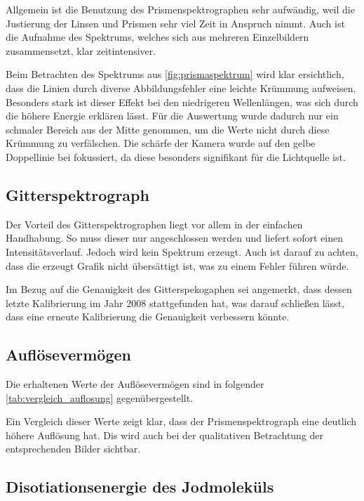 \documentclass[12pt,english,ngerman]{scrartcl}
\begin{document}
Allgemein ist die Benutzung des Prismenspektrographen sehr aufwändig, weil die Justierung der Linsen und Prismen sehr
viel Zeit in Anspruch nimmt. Auch ist die Aufnahme des Spektrums, welches sich aus mehreren Einzelbildern zusammensetzt,
klar zeitintensiver.

Beim Betrachten des Spektrums aus \autoref{fig:prismaspektrum} wird klar ersichtlich, dass die Linien durch diverse
Abbildungsfehler eine leichte Krümmung aufweisen. Besonders stark ist dieser Effekt bei den niedrigeren Wellenlängen, 
was sich durch die höhere Energie erklären lässt. Für die Auswertung wurde dadurch nur ein schmaler Bereich aus der Mitte
genommen, um die Werte nicht durch diese Krümmung zu verfälschen.
Die schärfe der Kamera wurde auf den gelbe Doppellinie bei 
fokussiert, da diese besonders signifikant für die Lichtquelle ist.


\subsection{Gitterspektrograph}

Der Vorteil des Gitterspektrographen liegt vor allem in der einfachen Handhabung. So muss dieser nur angeschlossen
werden und liefert sofort einen Intensitätsverlauf. Jedoch wird kein Spektrum erzeugt. Auch ist darauf zu achten, 
dass die erzeugt Grafik nicht übersättigt ist, was zu einem Fehler führen würde.

Im Bezug auf die Genauigkeit des Gitterspekogaphen sei angemerkt, dass dessen letzte Kalibrierung im Jahr 2008
stattgefunden hat, was darauf schließen lässt, dass eine erneute Kalibrierung die Genauigkeit verbessern könnte.


\subsection{Auflösevermögen}
Die erhaltenen Werte der Auflösevermögen sind in folgender \autoref{tab:vergleich_auflosung} gegenübergestellt.

Ein Vergleich dieser Werte zeigt klar, dass der Prismenspektrograph eine deutlich höhere Auflösung hat.
Dis wird auch bei der qualitativen Betrachtung der entsprechenden Bilder sichtbar.


\subsection{Disotiationsenergie des Jodmoleküls}
\end{document}
